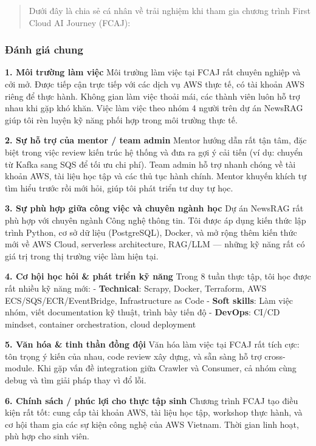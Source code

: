 \begin{quote}
Dưới đây là chia sẻ cá nhân về trải nghiệm khi tham gia chương trình
First Cloud AI Journey (FCAJ):
\end{quote}

\hypertarget{ux111uxe1nh-giuxe1-chung}{%
\subsubsection{Đánh giá chung}}

\textbf{1. Môi trường làm việc} Môi trường làm việc tại FCAJ rất chuyên
nghiệp và cởi mở. Được tiếp cận trực tiếp với các dịch vụ AWS thực tế,
có tài khoản AWS riêng để thực hành. Không gian làm việc thoải mái, các
thành viên luôn hỗ trợ nhau khi gặp khó khăn. Việc làm việc theo nhóm 4
người trên dự án NewsRAG giúp tôi rèn luyện kỹ năng phối hợp trong môi
trường thực tế.

\textbf{2. Sự hỗ trợ của mentor / team admin} Mentor hướng dẫn rất tận
tâm, đặc biệt trong việc review kiến trúc hệ thống và đưa ra gợi ý cải
tiến (ví dụ: chuyển từ Kafka sang SQS để tối ưu chi phí). Team admin hỗ
trợ nhanh chóng về tài khoản AWS, tài liệu học tập và các thủ tục hành
chính. Mentor khuyến khích tự tìm hiểu trước rồi mới hỏi, giúp tôi phát
triển tư duy tự học.

\textbf{3. Sự phù hợp giữa công việc và chuyên ngành học} Dự án NewsRAG
rất phù hợp với chuyên ngành Công nghệ thông tin. Tôi được áp dụng kiến
thức lập trình Python, cơ sở dữ liệu (PostgreSQL), Docker, và mở rộng
thêm kiến thức mới về AWS Cloud, serverless architecture, RAG/LLM ---
những kỹ năng rất có giá trị trong thị trường việc làm hiện tại.

\textbf{4. Cơ hội học hỏi \& phát triển kỹ năng} Trong 8 tuần thực tập,
tôi học được rất nhiều kỹ năng mới: - \textbf{Technical}: Scrapy,
Docker, Terraform, AWS ECS/SQS/ECR/EventBridge, Infrastructure as Code -
\textbf{Soft skills}: Làm việc nhóm, viết documentation kỹ thuật, trình
bày tiến độ - \textbf{DevOps}: CI/CD mindset, container orchestration,
cloud deployment

\textbf{5. Văn hóa \& tinh thần đồng đội} Văn hóa làm việc tại FCAJ rất
tích cực: tôn trọng ý kiến của nhau, code review xây dựng, và sẵn sàng
hỗ trợ cross-module. Khi gặp vấn đề integration giữa Crawler và
Consumer, cả nhóm cùng debug và tìm giải pháp thay vì đổ lỗi.

\textbf{6. Chính sách / phúc lợi cho thực tập sinh} Chương trình FCAJ
tạo điều kiện rất tốt: cung cấp tài khoản AWS, tài liệu học tập,
workshop thực hành, và cơ hội tham gia các sự kiện công nghệ của AWS
Vietnam. Thời gian linh hoạt, phù hợp cho sinh viên.

